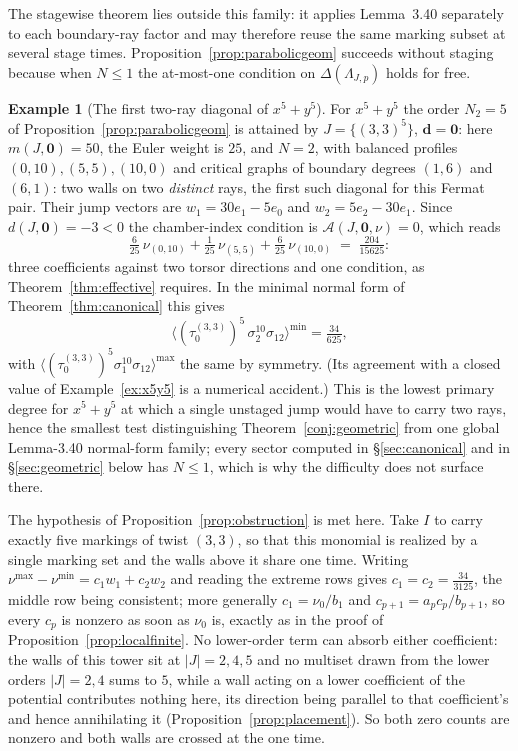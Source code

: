 \documentclass[11pt]{amsart}
\theoremstyle{definition}
\newtheorem{example}[theorem]{Example}
\theoremstyle{remark}
\newcommand{\Ascr}{\mathcal{A}}
\begin{document}
The stagewise theorem lies outside this family: it applies Lemma~3.40 separately
to each boundary-ray factor and may therefore reuse the same marking subset at
several stage times. Proposition~\ref{prop:parabolicgeom} succeeds without
staging because when $N\le1$ the at-most-one condition on
$\Delta(\Lambda_{J,p})$ holds for free.

\begin{example}[The first two-ray diagonal of $x^5+y^5$]
\label{ex:tworay}
For $x^{5}+y^{5}$ the order $N_{2}=5$ of
Proposition~\ref{prop:parabolicgeom} is attained by $J=\{(3,3)^{5}\}$,
$\mathbf d=\mathbf 0$: here $m(J,\mathbf 0)=50$, the Euler weight is $25$, and
$N=2$, with balanced profiles $(0,10),(5,5),(10,0)$ and critical graphs of
boundary degrees $(1,6)$ and $(6,1)$: two walls on two \emph{distinct} rays,
the first such diagonal for this Fermat pair. Their jump vectors are
$w_{1}=30e_{1}-5e_{0}$ and $w_{2}=5e_{2}-30e_{1}$. Since $d(J,\mathbf 0)=-3<0$ the
chamber-index condition is $\Ascr(J,\mathbf 0,\nu)=0$, which reads
\[
\tfrac{6}{25}\,\nu_{(0,10)}+\tfrac1{25}\,\nu_{(5,5)}+\tfrac{6}{25}\,\nu_{(10,0)}
\;=\;\tfrac{204}{15625}:
\]
three coefficients against two torsor directions and one condition, as
Theorem~\ref{thm:effective} requires. In the minimal normal form of
Theorem~\ref{thm:canonical} this gives
\[
\bigl\langle(\tau_{0}^{(3,3)})^{5}\,\sigma_{2}^{10}\sigma_{12}\bigr\rangle^{\min}
=\tfrac{34}{625},
\]
with $\bigl\langle(\tau_{0}^{(3,3)})^{5}\sigma_{1}^{10}\sigma_{12}\bigr\rangle^{\max}$
the same by symmetry. (Its agreement with a closed value of
Example~\ref{ex:x5y5} is a numerical accident.) This is the lowest primary degree
for $x^5+y^5$
at which a single unstaged jump would have to carry two rays, hence the smallest
test distinguishing Theorem~\ref{conj:geometric} from one global
Lemma-3.40 normal-form family; every sector computed
in \S\ref{sec:canonical} and in \S\ref{sec:geometric} below has $N\le1$, which is
why the difficulty does not surface there.

The hypothesis of Proposition~\ref{prop:obstruction} is met here. Take $I$ to carry
exactly five markings of twist $(3,3)$, so that this monomial is realized by a single
marking set and the walls above it share one time. Writing
$\nu^{\max}-\nu^{\min}=c_{1}w_{1}+c_{2}w_{2}$ and reading the extreme rows gives
$c_{1}=c_{2}=\tfrac{34}{3125}$, the middle row being consistent; more generally
$c_{1}=\nu_{0}/b_{1}$ and $c_{p+1}=a_{p}c_{p}/b_{p+1}$, so every $c_{p}$ is nonzero as
soon as $\nu_{0}$ is, exactly as in the proof of Proposition~\ref{prop:localfinite}.
No lower-order term can absorb either coefficient: the walls of this tower sit at
$|J|=2,4,5$ and no multiset drawn from the lower orders $|J|=2,4$ sums to $5$, while a wall acting on a lower
coefficient of the potential contributes nothing here, its direction being parallel to
that coefficient's and hence annihilating it (Proposition~\ref{prop:placement}). So both
zero counts are nonzero and both walls are crossed at the one time.


\end{example}
\end{document}
